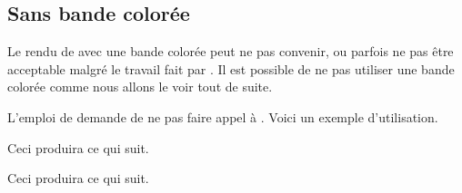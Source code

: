 \documentclass[10pt, a4paper]{article}
\begin{document}

\subsection{Sans bande colorée}

Le rendu de  avec une bande colorée peut ne pas convenir, ou parfois ne pas être acceptable malgré le travail fait par .
Il est possible de ne pas utiliser une bande colorée comme nous allons le voir tout de suite.

\begin{tdocexa}
    L'emploi de  demande de ne pas faire appel à .
    Voici un exemple d'utilisation.


    Ceci produira ce qui suit.

    \medskip

    
\end{tdocexa}




\begin{tdocexa}
    \leavevmode


    Ceci produira ce qui suit.

    \medskip

    
\end{tdocexa}
\end{document}

